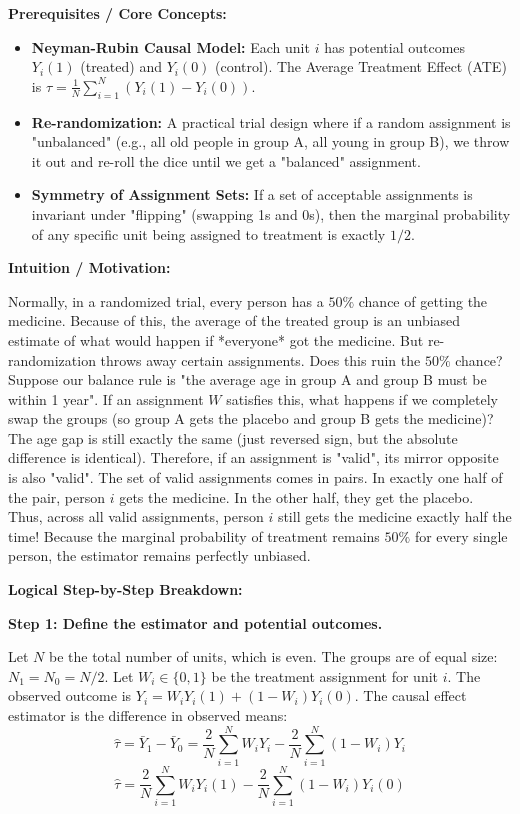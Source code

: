 \begin{solution}
\textbf{Prerequisites / Core Concepts:}
\begin{itemize}
    \item \textbf{Neyman-Rubin Causal Model:} Each unit $i$ has potential outcomes $Y_i(1)$ (treated) and $Y_i(0)$ (control). The Average Treatment Effect (ATE) is $\tau = \frac{1}{N} \sum_{i=1}^N (Y_i(1) - Y_i(0))$.
    \item \textbf{Re-randomization:} A practical trial design where if a random assignment is "unbalanced" (e.g., all old people in group A, all young in group B), we throw it out and re-roll the dice until we get a "balanced" assignment.
    \item \textbf{Symmetry of Assignment Sets:} If a set of acceptable assignments is invariant under "flipping" (swapping 1s and 0s), then the marginal probability of any specific unit being assigned to treatment is exactly $1/2$.
\end{itemize}

\textbf{Intuition / Motivation:}

Normally, in a randomized trial, every person has a $50\%$ chance of getting the medicine. Because of this, the average of the treated group is an unbiased estimate of what would happen if *everyone* got the medicine.
But re-randomization throws away certain assignments. Does this ruin the $50\%$ chance? 
Suppose our balance rule is "the average age in group A and group B must be within 1 year". If an assignment $W$ satisfies this, what happens if we completely swap the groups (so group A gets the placebo and group B gets the medicine)? The age gap is still exactly the same (just reversed sign, but the absolute difference is identical).
Therefore, if an assignment is "valid", its mirror opposite is also "valid". The set of valid assignments comes in pairs. In exactly one half of the pair, person $i$ gets the medicine. In the other half, they get the placebo. Thus, across all valid assignments, person $i$ still gets the medicine exactly half the time!
Because the marginal probability of treatment remains $50\%$ for every single person, the estimator remains perfectly unbiased.

\textbf{Logical Step-by-Step Breakdown:}

\textbf{Step 1: Define the estimator and potential outcomes.}

Let $N$ be the total number of units, which is even. The groups are of equal size: $N_1 = N_0 = N/2$.
Let $W_i \in \{0, 1\}$ be the treatment assignment for unit $i$. The observed outcome is $Y_i = W_i Y_i(1) + (1-W_i)Y_i(0)$.
The causal effect estimator is the difference in observed means:
\[ \hat{\tau} = \bar{Y}_1 - \bar{Y}_0 = \frac{2}{N} \sum_{i=1}^N W_i Y_i - \frac{2}{N} \sum_{i=1}^N (1-W_i) Y_i \]
\[ \hat{\tau} = \frac{2}{N} \sum_{i=1}^N W_i Y_i(1) - \frac{2}{N} \sum_{i=1}^N (1-W_i) Y_i(0) \]


\end{solution}
